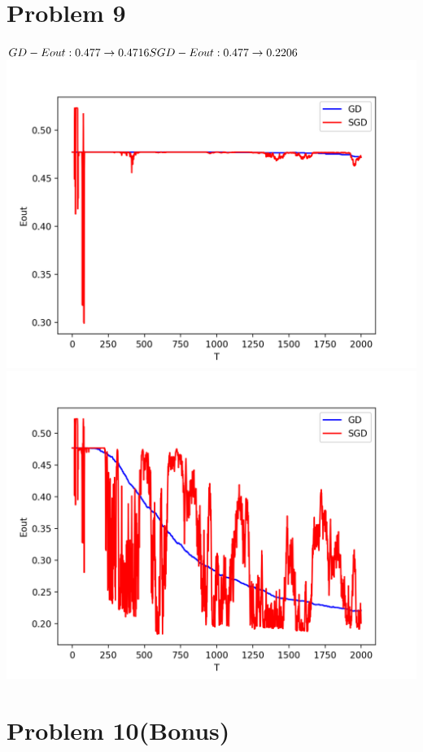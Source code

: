 \documentclass[12pt, a4paper]{article}
\begin{document}
\begin{CJK}{UTF8}{bkai}
	\section*{Problem 9}
		$GD-Eout: 0.477 \rightarrow 0.4716\\
		SGD-Eout: 0.477 \rightarrow 0.2206$ \\
		\includegraphics[width=14cm, keepaspectratio=true]{eout_8.png}\\
		\includegraphics[width=14cm, keepaspectratio=true]{eout_9.png}


	\section*{Problem 10(Bonus)}

\end{CJK}
\end{document}
